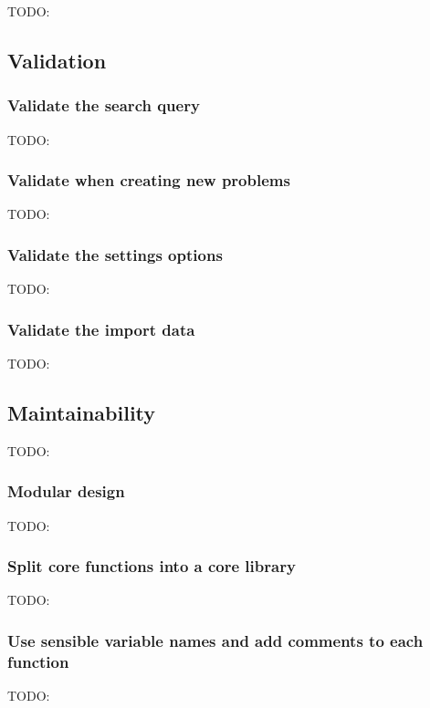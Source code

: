 \documentclass[a4paper]{report}
\begin{document}
TODO:

\subsection{Validation}

\subsubsection{Validate the search query}

TODO:

\subsubsection{Validate when creating new problems}

TODO:

\subsubsection{Validate the settings options}

TODO:

\subsubsection{Validate the import data}

TODO:

\subsection{Maintainability}

TODO:

\subsubsection{Modular design}

TODO:

\subsubsection{Split core functions into a core library}

TODO:

\subsubsection{Use sensible variable
names and add comments to each function}

TODO:
\end{document}

